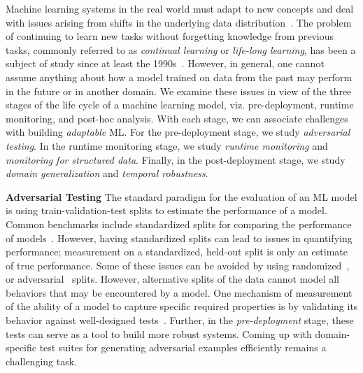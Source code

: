 Machine learning systems in the real world must adapt to new concepts and deal with issues arising from shifts in the underlying data distribution~\citep{huyen2022designing}.
The problem of continuing to learn new tasks without forgetting knowledge from previous tasks, commonly referred to as \textit{continual learning} or \textit{life-long learning}, has been a subject of study since at least the 1990s~\citep{thrun1998lifelong}.
However, in general, one cannot assume anything about how a model trained on data from the past may perform in the future or in another domain. 
We examine these issues in view of the three stages of the life cycle of a machine learning model, viz. pre-deployment, runtime monitoring, and post-hoc analysis.
With each stage, we can associate challenges with building \textit{adaptable} ML.
For the pre-deployment stage, we study \textit{adversarial testing}.
In the runtime monitoring stage, we study \textit{runtime monitoring} and \textit{monitoring for structured data}.
Finally, in the post-deployment stage, we study \textit{domain generalization} and \textit{temporal robustness}. 

\noindent \textbf{Adversarial Testing}
The standard paradigm for the evaluation of an ML model is using train-validation-test splits to estimate the performance of a model. 
Common benchmarks include standardized splits for comparing the performance of models~\citep{gorman2019need}.
However, having standardized splits can lead to issues in quantifying performance; measurement on a standardized, held-out split is only an estimate of true performance.
Some of these issues can be avoided by using randomized~\citep{gorman2019need}, or adversarial~\citep{sogaard2021need} splits.
However, alternative splits of the data cannot model all behaviors that may be encountered by a model.
One mechanism of measurement of the ability of a model to capture specific required properties is by validating its behavior against well-designed tests~\cite{ribeiro2020beyond}.
Further, in the \textit{pre-deployment} stage, these tests can serve as a tool to build more robust systems. 
Coming up with domain-specific test suites for generating adversarial examples efficiently remains a challenging task.

